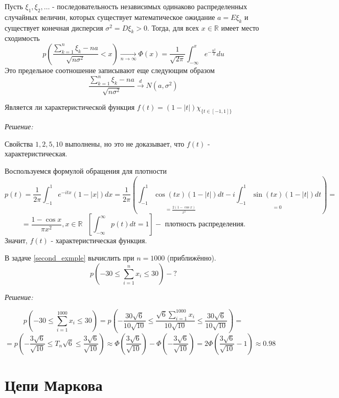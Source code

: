 \begin{theorem}
	Пусть $\xi_1, \xi_2, \dots$ - последовательность независимых одинаково распределенных случайных величин,  которых существует математическое ожидание $a = E\xi_k$ и существует конечная дисперсия $\sigma^2 = D\xi_k > 0$. Тогда, для всех $x \in \mathbb{R}$ имеет место сходимость
	\[
	p \left( \frac{\sum\limits_{k=1}^{n} \xi_k - na}{\sqrt{n \sigma^2}} < x \right) \underset{n \to \infty}{\to} \Phi (x) = \frac{1}{\sqrt{2 \pi}} \int_{-\infty}^{x} e^{- \frac{u^2}{2}} du
	\]
	Это предельное соотношение записывают еще следующим образом
	\[
	\frac{\sum\limits_{k=1}^{n} \xi_k - na}{\sqrt{n \sigma^2}} \overset{d}{\to} N (a, \sigma^2)
	\]
\end{theorem}
\begin{exmp}
	Является ли характеристической функция $f(t) = (1 - |t|) \chi_{ \{ t \in [-1, 1] \} } $
	
	\textit{Решение:}
	
	Свойства $1,2,5,10$ выполнены, но это не доказывает, что $f(t)$ - характеристическая.
	
	Воспользуемся формулой обращения для плотности
	\[
	p(t) = \frac{1}{2 \pi} \int_{-1}^{1} e^{-itx} (1 - |x|) dx = \frac{1}{2 \pi} \left( \underset{=\frac{2(1 - \cos x)}{x^2}}{\int_{-1}^{1} \cos (tx) (1 - |t|) dt} - \underset{=0}{i \int_{-1}^{1} \sin (tx) (1 - |t|) dt} \right) =
	\]
	\[ = \frac{1 - \cos x}{\pi x^2}, x \in \mathbb{R} ~~~ \left[ \int_{-\infty}^{\infty} p(t) dt = 1 \right] - \text{ плотность распределения.} \]
	Значит, $f(t)$ - характеристическая функция.
\end{exmp}
\begin{exmp}
	В задаче \ref{second_exmple} вычислить при $n = 1000$ (приближённо).
	\[ p \left( -30 \le \sum\limits_{i=1}^{n} x_i \le 30 \right) - ? \]
	
	\textit{Решение:}
	
	\[
	p \left( -30 \le \sum\limits_{i=1}^{1000} x_i \le 30 \right) = p \left( - \frac{30 \sqrt{6}}{10 \sqrt{10}} \le \frac{\sqrt{6} \sum\limits_{i=1}^{1000} x_i}{10 \sqrt{10}} \le \frac{30 \sqrt{6}}{10 \sqrt{10}} \right) =
	\]
	\[
	= p \left( - \frac{3 \sqrt{6}}{\sqrt{10}} \le T_n \sqrt{6} \le \frac{3 \sqrt{6}}{\sqrt{10}} \right) \approx \Phi \left( \frac{3 \sqrt{6}}{\sqrt{10}} \right) - \Phi \left( - \frac{3 \sqrt{6}}{\sqrt{10}} \right) = 2 \Phi \left( \frac{3 \sqrt{6}}{\sqrt{10}} - 1  \right) \approx 0.98
	\]
\end{exmp}

\section{Цепи Маркова}

